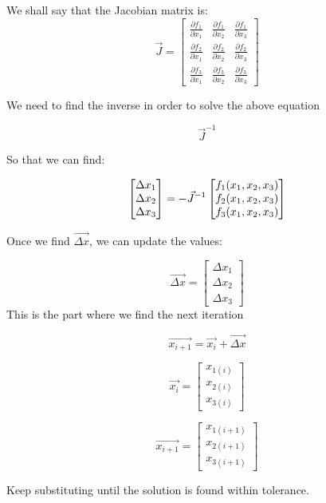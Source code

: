 \documentclass[12pt]{article}
\renewcommand{\_}{\kern-1.5pt\textunderscore\kern-1.5pt}
\begin{document}
We shall say that the Jacobian matrix is:
$$ \vec{J} = \begin{bmatrix}
\frac{\partial f_1}{\partial x_1}  & \frac{\partial f_1}{\partial x_2}  & \frac{\partial f_1}{\partial x_3} \\
\frac{\partial f_2}{\partial x_1}  & \frac{\partial f_2}{\partial x_2}  & \frac{\partial f_2}{\partial x_3} \\
\frac{\partial f_3}{\partial x_1}  & \frac{\partial f_3}{\partial x_2}  & \frac{\partial f_3}{\partial x_3} 
\end{bmatrix}$$

We need to find the inverse in order to solve the above equation

$$\vec{J}^{-1}$$

So that we can find:

$$  
\begin{bmatrix}
\Delta x_1 \\
\Delta x_2 \\
\Delta x_3
\end{bmatrix} = - \vec{J}^{-1} \\
\begin{bmatrix}
f_1 (x_1,x_2,x_3) \\
f_2 (x_1,x_2,x_3) \\
f_3 (x_1,x_2,x_3)
\end{bmatrix}
$$

Once we find $\vec{\Delta x}$, we can update the values:

$$\vec{\Delta x} = \begin{bmatrix}
\Delta x_1 \\
\Delta x_2 \\
\Delta x_3
\end{bmatrix}$$
This is the part where we find the next iteration

$$\overrightarrow{x_{i+1}} = \overrightarrow{x_i} + \overrightarrow{\Delta x}$$

$$\overrightarrow{x_i} = \begin{bmatrix}
x_{1(i)} \\
x_{2(i)} \\
x_{3(i)}
\end{bmatrix} $$

$$\overrightarrow{x_{i+1}} = \begin{bmatrix}
x_{1(i+1)} \\
x_{2(i+1)} \\
x_{3(i+1)}
\end{bmatrix} $$

Keep substituting until the solution is found within tolerance.
\end{document}
